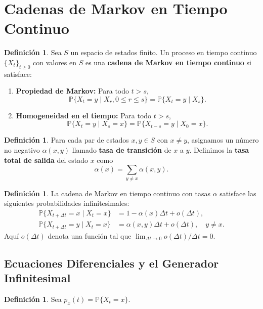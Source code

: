 \documentclass{article}
\theoremstyle{plain}
\theoremstyle{definition}
\newtheorem{Definicion}[Teorema]{Definici\'on}
\newcommand{\Prob}{\mathbb{P}}
\begin{document}
\section{Cadenas de Markov en Tiempo Continuo}

\begin{Definicion}
  Sea $S$ un espacio de estados finito. Un proceso en tiempo continuo $\{X_t\}_{t \geq 0}$ con valores en $S$ es una \textbf{cadena de Markov en tiempo continuo} si satisface:
  \begin{enumerate}
    \item \textbf{Propiedad de Markov:} Para todo $t > s$,
    \[ \Prob\{X_t = y \mid X_r, 0 \leq r \leq s\} = \Prob\{X_t = y \mid X_s\}. \]
    \item \textbf{Homogeneidad en el tiempo:} Para todo $t > s$,
    \[ \Prob\{X_t = y \mid X_s = x\} = \Prob\{X_{t-s} = y \mid X_0 = x\}. \]
  \end{enumerate}
\end{Definicion}

\begin{Definicion}
  Para cada par de estados $x, y \in S$ con $x \neq y$, asignamos un n\'umero no negativo $\alpha(x,y)$ llamado \textbf{tasa de transici\'on} de $x$ a $y$. Definimos la \textbf{tasa total de salida} del estado $x$ como
  \[ \alpha(x) = \sum_{y \neq x} \alpha(x,y). \]
\end{Definicion}

\begin{Definicion}
  La cadena de Markov en tiempo continuo con tasas $\alpha$ satisface las siguientes probabilidades infinitesimales:
  \begin{align}
    \Prob\{X_{t+\Delta t} = x \mid X_t = x\} &= 1 - \alpha(x)\Delta t + o(\Delta t), \label{eq:stay}\\
    \Prob\{X_{t+\Delta t} = y \mid X_t = x\} &= \alpha(x,y)\Delta t + o(\Delta t), \quad y \neq x. \label{eq:jump}
  \end{align}
  Aqu\'i $o(\Delta t)$ denota una funci\'on tal que $\lim_{\Delta t \to 0} o(\Delta t)/\Delta t = 0$.
\end{Definicion}

\subsection{Ecuaciones Diferenciales y el Generador Infinitesimal}

\begin{Definicion}
  Sea $p_x(t) = \Prob\{X_t = x\}$.
\end{Definicion}
\end{document}
